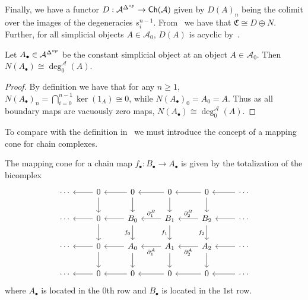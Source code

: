 Finally, we have a functor $D:\mathcal{A}^{\Delta^{op}}\to \textup{\textsf{Ch}}(\mathcal{A})$ given by $D(A)_n$ being the colimit over the images of the degeneracies $s_i^{n-1}$. From~\cite[Lem 8.3.7]{weibel_1994} we have that $\mathfrak{C}\cong D\oplus N$. Further, for all simplicial objects $A \in \mathcal{A}_0$, $D(A)$ is acyclic by~\cite[Thm 8.3.8]{weibel_1994}.


\begin{prop}[label=prop:constDoldKan]
    Let $A_\bullet \in \mathcal{A}^{\Delta^{op}}$ be the constant simplicial object at an object $A \in \mathcal{A}_0$. Then $N(A_\bullet)\cong  \deg_0^\mathcal{A}(A)$.
\end{prop}
\begin{proof}
    By definition we have that for any $n \geq 1$, $N(A_\bullet)_n = \bigcap_{i=0}^{n-1}\ker(1_A) \cong 0$, while $N(A_\bullet)_0 = A_0 = A$. Thus as all boundary maps are vacuously zero maps, $N(A_\bullet)\cong \deg_0^\mathcal{A}(A)$. 
\end{proof}

To compare with the definition in~\cite{Johnson2003DerivingCW} we must introduce the concept of a mapping cone for chain complexes.

\begin{defn}{ \cite[Sec. 1.5.1]{weibel_1994}}
    The mapping cone for a chain map $f_\bullet:B_\bullet\to A_\bullet$ is given by the totalization of the bicomplex
    \[\begin{tikzcd}
    	\cdots & 0 & 0 & 0 & 0 & \cdots \\
    	\cdots & 0 & {B_0} & {B_1} & {B_2} & \cdots \\
    	\cdots & 0 & {A_0} & {A_1} & {A_2} & \cdots \\
    	\cdots & 0 & 0 & 0 & 0 & \cdots
    	\arrow[from=3-3, to=3-2]
    	\arrow[from=3-2, to=3-1]
    	\arrow["{\partial_1^A}", from=3-4, to=3-3]
    	\arrow["{\partial_2^A}", from=3-5, to=3-4]
    	\arrow[from=3-6, to=3-5]
    	\arrow[from=3-3, to=4-3]
    	\arrow[from=3-4, to=4-4]
    	\arrow[from=3-5, to=4-5]
    	\arrow[from=3-2, to=4-2]
    	\arrow[from=4-3, to=4-2]
    	\arrow[from=4-2, to=4-1]
    	\arrow[from=4-4, to=4-3]
    	\arrow[from=4-5, to=4-4]
    	\arrow[from=4-6, to=4-5]
    	\arrow["{\partial_1^B}"', from=2-4, to=2-3]
    	\arrow["{\partial_2^B}"', from=2-5, to=2-4]
    	\arrow[from=2-6, to=2-5]
    	\arrow[from=2-3, to=2-2]
    	\arrow[from=2-2, to=3-2]
    	\arrow[from=2-2, to=2-1]
    	\arrow["{f_0}"', from=2-3, to=3-3]
    	\arrow["{f_1}"', from=2-4, to=3-4]
    	\arrow["{f_2}"', from=2-5, to=3-5]
    	\arrow[from=1-2, to=1-1]
    	\arrow[from=1-6, to=1-5]
    	\arrow[from=1-5, to=2-5]
    	\arrow[from=1-5, to=1-4]
    	\arrow[from=1-4, to=2-4]
    	\arrow[from=1-4, to=1-3]
    	\arrow[from=1-3, to=2-3]
    	\arrow[from=1-3, to=1-2]
    	\arrow[from=1-2, to=2-2]
    \end{tikzcd}\]
    where $A_\bullet$ is located in the $0$th row and $B_\bullet$ is located in the $1$st row.
\end{defn}

